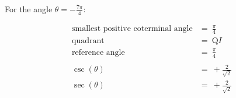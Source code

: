 For the angle $\theta = -\frac{7\pi}{4}$:

$$
\begin{align*}
  \text{smallest positive coterminal angle} &=\ \frac{\pi}{4} \\
  \text{quadrant} &=\ \text{Q}I \\
  \text{reference angle} &=\ \frac{\pi}{4} \\
  \\
  \csc(\theta) &=\ +\frac{2}{\sqrt{2}} \\
  \sec(\theta) &=\ +\frac{2}{\sqrt{2}}
\end{align*}
$$
